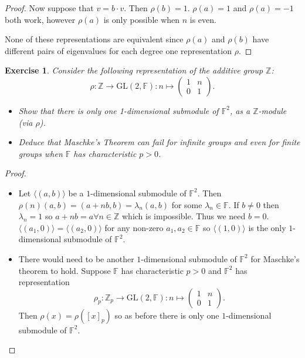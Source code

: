 \documentclass{article}
\newtheorem{exercise}[theorem]{Exercise}
\begin{document}
\begin{proof}
Now suppose that $v=b\cdot v$. Then $\rho(b)=1$. $\rho(a)=1$ and $\rho(a)=-1$ both work, however $\rho(a)$ is only possible when $n$ is even.

None of these representations are equivalent since $\rho(a)$ and $\rho(b)$ have different pairs of eigenvalues for each degree one representation $\rho$.
\end{proof}


\begin{exercise}Consider the following representation of the additive group $\mathbb{Z}$:
\[
\rho : \mathbb{Z} \to \text{GL}(2, \mathbb{F}) : n \mapsto 
\begin{pmatrix}
1 & n \\
0 & 1
\end{pmatrix}.
\]
\begin{itemize}
    \item[(a)] Show that there is only one 1-dimensional submodule of $\mathbb{F}^2$, as a $\mathbb{Z}$-module (via $\rho$).
    \item[(b)] Deduce that Maschke's Theorem can fail for infinite groups and even for finite groups when $\mathbb{F}$ has characteristic $p > 0$.
\end{itemize}
\end{exercise}
\begin{proof}
\begin{itemize}
    \item[(a)] Let $\langle(a,b)\rangle$ be a $1$-dimensional submodule of $\mathbb{F}^2$. Then $\rho(n)(a,b)=(a+nb,b)=\lambda_n(a,b)$ for some $\lambda_n\in\mathbb{F}$. If $b\neq0$ then $\lambda_n=1$ so $a+nb=a\forall n\in\mathbb{Z}$ which is impossible. Thus we need $b=0$. $\langle(a_1,0)\rangle=\langle(a_2,0)\rangle$ for any non-zero $a_1,a_2\in\mathbb{F}$ so $\langle(1,0)\rangle$ is the only $1$-dimensional submodule of $\mathbb{F}^2$.
    \item[(b)] There would need to be another $1$-dimensional submodule of $\mathbb{F}^2$ for Maschke's theorem to hold. Suppose $\mathbb{F}$ has characteristic $p>0$ and $\mathbb{F}^2$ has representation \[
\rho_p : \mathbb{Z}_p \to \text{GL}(2, \mathbb{F}) : n \mapsto 
\begin{pmatrix}
1 & n \\
0 & 1
\end{pmatrix}.
\] Then $\rho(x)=\rho([x]_p)$ so as before there is only one $1$-dimensional submodule of $\mathbb{F}^2$.
\end{itemize}
\end{proof}
\end{document}
